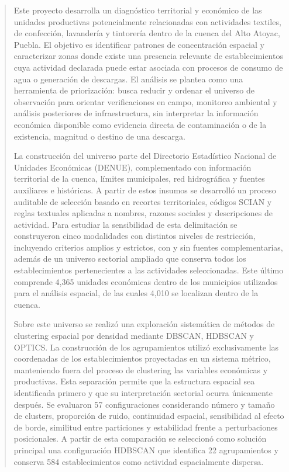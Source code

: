 \documentclass[11pt,letterpaper]{article}
\begin{document}
\begin{abstract}

Este proyecto desarrolla un diagnóstico territorial y económico de las unidades productivas potencialmente relacionadas con actividades textiles, de confección, lavandería y tintorería dentro de la cuenca del Alto Atoyac, Puebla. El objetivo es identificar patrones de concentración espacial y caracterizar zonas donde existe una presencia relevante de establecimientos cuya actividad declarada puede estar asociada con procesos de consumo de agua o generación de descargas. El análisis se plantea como una herramienta de priorización: busca reducir y ordenar el universo de observación para orientar verificaciones en campo, monitoreo ambiental y análisis posteriores de infraestructura, sin interpretar la información económica disponible como evidencia directa de contaminación o de la existencia, magnitud o destino de una descarga.

La construcción del universo parte del Directorio Estadístico Nacional de Unidades Económicas (DENUE), complementado con información territorial de la cuenca, límites municipales, red hidrográfica y fuentes auxiliares e históricas. A partir de estos insumos se desarrolló un proceso auditable de selección basado en recortes territoriales, códigos SCIAN y reglas textuales aplicadas a nombres, razones sociales y descripciones de actividad. Para estudiar la sensibilidad de esta delimitación se construyeron cinco modalidades con distintos niveles de restricción, incluyendo criterios amplios y estrictos, con y sin fuentes complementarias, además de un universo sectorial ampliado que conserva todos los establecimientos pertenecientes a las actividades seleccionadas. Este último comprende 4,365 unidades económicas dentro de los municipios utilizados para el análisis espacial, de las cuales 4,010 se localizan dentro de la cuenca.

Sobre este universo se realizó una exploración sistemática de métodos de clustering espacial por densidad mediante DBSCAN, HDBSCAN y OPTICS. La construcción de los agrupamientos utilizó exclusivamente las coordenadas de los establecimientos proyectadas en un sistema métrico, manteniendo fuera del proceso de clustering las variables económicas y productivas. Esta separación permite que la estructura espacial sea identificada primero y que su interpretación sectorial ocurra únicamente después. Se evaluaron 57 configuraciones considerando número y tamaño de clusters, proporción de ruido, continuidad espacial, sensibilidad al efecto de borde, similitud entre particiones y estabilidad frente a perturbaciones posicionales. A partir de esta comparación se seleccionó como solución principal una configuración HDBSCAN que identifica 22 agrupamientos y conserva 584 establecimientos como actividad espacialmente dispersa.


\end{abstract}
\end{document}
